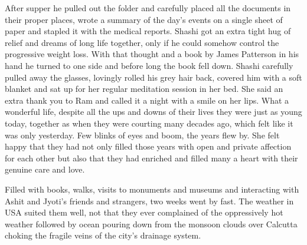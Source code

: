 After supper he pulled out the folder and carefully placed all the
documents in their proper places, wrote a summary of the day's events on
a single sheet of paper and stapled it with the medical reports. Shashi
got an extra tight hug of relief and dreams of long life together, only
if he could somehow control the progressive weight loss. With that
thought and a book by James Patterson in his hand he turned to one side
and before long the book fell down. Shashi carefully pulled away the
glasses, lovingly rolled his grey hair back, covered him with a soft
blanket and sat up for her regular meditation session in her bed. She
said an extra thank you to Ram and called it a night with a smile on her
lips. What a wonderful life, despite all the ups and downs of their
lives they were just as young today, together as when they were courting
many decades ago, which felt like it was only yesterday. Few blinks of
eyes and boom, the years flew by. She felt happy that they had not only
filled those years with open and private affection for each other but
also that they had enriched and filled many a heart with their genuine
care and love.

Filled with books, walks, visits to monuments and museums and
interacting with Ashit and Jyoti's friends and strangers, two weeks went
by fast. The weather in USA suited them well, not that they ever
complained of the oppressively hot weather followed by ocean pouring
down from the monsoon clouds over Calcutta choking the fragile veins of
the city's drainage system.

